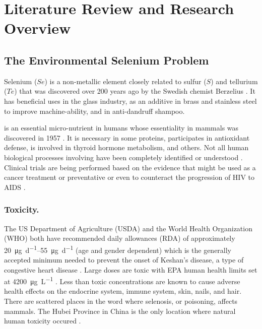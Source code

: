 \chapter{Literature Review and Research Overview}
\label{chap:litreview}

\section{The Environmental Selenium Problem}
\label{sec:the selenium problem}

Selenium ($ Se $) is a non-metallic element closely related to sulfur ($ S $) and tellurium ($ Te $) that was discovered over 200 years ago by the Swedish chemist Berzelius \parencite{scott1973}.  It has beneficial uses in the glass industry, as an additive in brass and stainless steel to improve machine-ability, and in anti-dandruff shampoo.  

\Se is an essential micro-nutrient in humans whose essentiality in mammals was discovered in 1957 \parencite{schwarz1957}.   It is necessary in some proteins, participates in antioxidant defense, is involved in thyroid hormone metabolism, and others.  Not all human biological processes involving \Se have been completely identified or understood \parencite{rayman2000,navarro2000,roman2014}.  Clinical trials are being performed based on the evidence that \Se might be used as a cancer treatment or preventative or even to counteract the progression of HIV to AIDS \parencite{rayman2000,roman2014}.

\subsection*{\Se Toxicity.}
The US Department of Agriculture (USDA) and the World Health Organization (WHO) both have recommended daily allowances (RDA) of approximately \SIrange{20}{55}{\micro\g\per\day} (age and gender dependent) which is the generally accepted minimum needed to prevent the onset of Keshan's disease, a type of congestive heart disease \parencite{world1996,USDA2010}.  Large \Se doses are toxic \parencite{roman2014,navarro2000} with EPA human health limits set at \SI{4200}{\micro\g\per\liter} \parencite{EPA-Se}.  Less than toxic concentrations are known to cause adverse health effects on the endocrine system, immune system, skin, nails, and hair.  There are scattered places in the word where selenosis, or \Se poisoning, affects mammals.  The Hubei Province in China is the only location where natural human \Se toxicity occured \parencite{2002Spallholz}.

